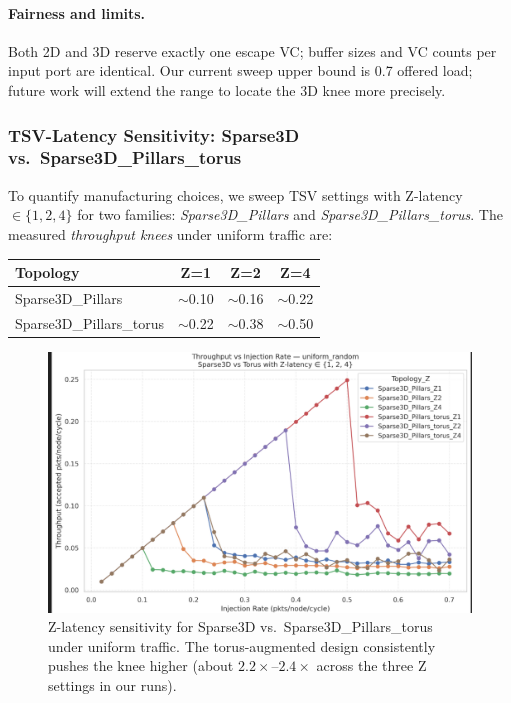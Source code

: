 \documentclass[11pt]{article}
\begin{document}
\paragraph{Fairness and limits.} Both 2D and 3D reserve exactly one escape VC; buffer sizes and VC counts per input port are identical. Our current sweep upper bound is 0.7 offered load; future work will extend the range to locate the 3D knee more precisely.

\subsubsection{TSV-Latency Sensitivity: Sparse3D vs.\ Sparse3D\_Pillars\_torus}
\label{subsec:z-latency-sweep}

To quantify manufacturing choices, we sweep TSV settings with Z-latency $\in \{1,2,4\}$ for two families:
\emph{Sparse3D\_Pillars} and \emph{Sparse3D\_Pillars\_torus}. The measured
\emph{throughput knees} under uniform traffic are:

\begin{center}
\begin{tabular}{lccc}
\toprule
\textbf{Topology} & \textbf{Z=1} & \textbf{Z=2} & \textbf{Z=4} \\
\midrule
Sparse3D\_Pillars & $\sim$0.10 & $\sim$0.16 & $\sim$0.22 \\
Sparse3D\_Pillars\_torus & $\sim$0.22 & $\sim$0.38 & $\sim$0.50 \\
\bottomrule
\end{tabular}
\end{center}

\begin{figure}[htbp]
  \centering
  \includegraphics[width=.92\linewidth]{./figs/tsv_latency_sweep_sparse_torus.png}
  \caption{Z-latency sensitivity for Sparse3D vs.\ Sparse3D\_Pillars\_torus under uniform traffic.
  The torus-augmented design consistently pushes the knee higher (about $2.2\!\times$--$2.4\!\times$
  across the three Z settings in our runs).}
  \label{fig:z-latency-sweep}
\end{figure}
\end{document}
